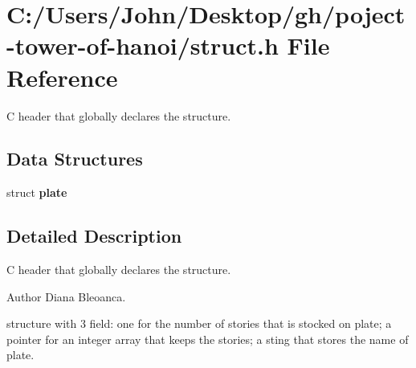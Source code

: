 \section{C\+:/\+Users/\+John/\+Desktop/gh/poject-\/tower-\/of-\/hanoi/struct.h File Reference}
\label{struct_8h}


C header that globally declares the structure.  


\subsection*{Data Structures}
\begin{DoxyCompactItemize}
\item 
struct \textbf{ plate}
\end{DoxyCompactItemize}


\subsection{Detailed Description}
C header that globally declares the structure. 

\begin{DoxyAuthor}{Author}
Diana Bleoanca.
\end{DoxyAuthor}
structure with 3 field\+: one for the number of stories that is stocked on plate; a pointer for an integer array that keeps the stories; a sting that stores the name of plate. 